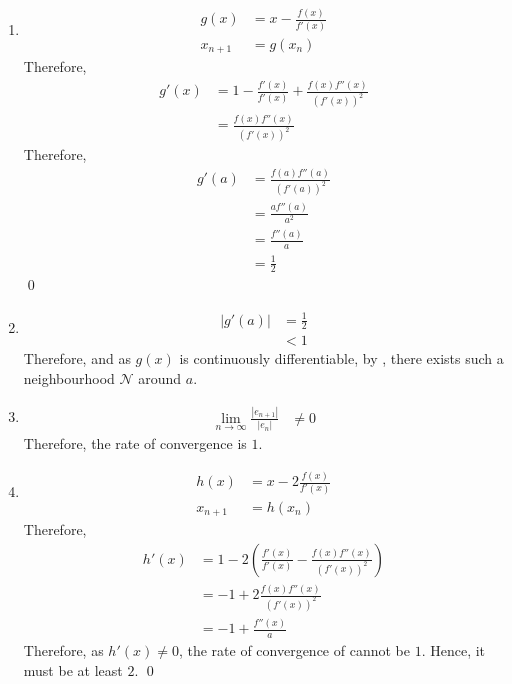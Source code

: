\documentclass[fleqn, a4paper, 11pt, oneside]{amsart}
\theoremstyle{definition}
\theoremstyle{theorem}
\begin{document}
\begin{solution}
	\begin{enumerate}[leftmargin=*]
		\item 
			\begin{align*}
				g(x)      & = x - \frac{f(x)}{f'(x)} \\
				x_{n + 1} & = g(x_n)
			\end{align*}
			Therefore,
			\begin{align*}
				g'(x) & = 1 - \frac{f'(x)}{f'(x)} + \frac{f(x) f''(x)}{\left( f'(x) \right)^2} \\
                                      & = \frac{f(x) f''(x)}{\left( f'(x) \right)^2}
			\end{align*}
			Therefore,
			\begin{align*}
				g'(a) & = \frac{f(a) f''(a)}{\left( f'(a) \right)^2} \\
                                      & = \frac{a f''(a)}{a^2}                       \\
                                      & = \frac{f''(a)}{a}                           \\
                                      & = \frac{1}{2}
			\end{align*}
			\qed
		\item
			\begin{align*}
				\left| g'(a) \right| & = \frac{1}{2} \\
                                                     & < 1
			\end{align*}
			Therefore, and as $g(x)$ is continuously differentiable, by , there exists such a neighbourhood $\mathcal{N}$ around $a$.
		\item
			\begin{align*}
				\lim\limits_{n \to \infty} \frac{|e_{n + 1}|}{|e_n|} & \neq 0
			\end{align*}
			Therefore, the rate of convergence is $1$.
		\item
			\begin{align*}
				h(x)      & = x - 2 \frac{f(x)}{f'(x)} \\
				x_{n + 1} & = h(x_n)
			\end{align*}
			Therefore,
			\begin{align*}
				h'(x) & = 1 - 2 \left( \frac{f'(x)}{f'(x)} - \frac{f(x) f''(x)}{\left( f'(x) \right)^2} \right) \\
                                      & = -1 + 2 \frac{f(x) f''(x)}{\left( f'(x) \right)^2}                                     \\
                                      & = -1 + \frac{f''(x)}{a}
			\end{align*}
			Therefore, as $h'(x) \neq 0$, the rate of convergence of cannot be $1$.
			Hence, it must be at least $2$.
			\qed
	\end{enumerate}
\end{solution}
\end{document}
